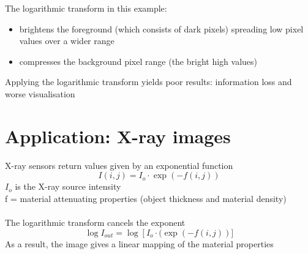 \documentclass{article}[18pt]
\begin{document}
The logarithmic transform in this example:
\begin{itemize}
	\item brightens the foreground (which consists of dark pixels) spreading low pixel values over a wider range
	\item compresses the background pixel range (the bright high values)
\end{itemize}
Applying the logarithmic transform yields poor results: information loss and worse visualisation
\section{Application: X-ray images}
X-ray sensors return values given by an exponential function
\[
I(i, j)=I_{o} \cdot \exp (-f(i, j))
\]
$I_o$ is the X-ray source intensity\\
f = material attenuating properties (object thickness and material density)\\
\\
The logarithmic transform cancels the exponent
\[
\log I_{o u t}=\log \left[I_{o} \cdot(\exp (-f(i, j))]\right.
\]
As a result, the image gives a linear mapping of the material properties
\end{document}
